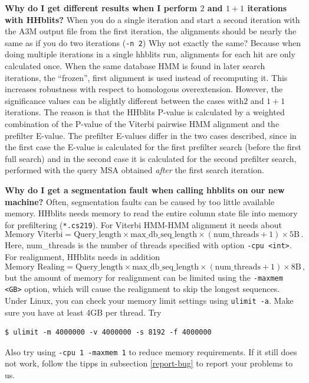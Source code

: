 \documentclass[11pt,a4paper]{article}
\begin{document}
{\label{2_vs_1+1} \bf Why do I get different results when I perform $2$ and $1+1$ iterations with HHblits?} When you do a single iteration and start a second iteration with the A3M output file from the first iteration, the alignments should be nearly the same as if you do two iterations (\verb`-n 2`) Why not exactly the same? Because when doing multiple iterations in a single hhblits run, alignments for each hit are only calculated once. When the same database HMM is found in later search iterations, the ``frozen'', first alignment is used instead of recomputing it. This increases robustness with respect to homologous overextension. However, the significance values can be slightly different between the cases with$2$ and $1+1$ iterations. The reason is that the HHblits P-value is calculated by a weighted combination of the P-value of the Viterbi pairwise HMM alignment and the prefilter E-value. The prefilter E-values differ in the two cases described, since in the first case the E-value is calculated for the first prefilter search (before the first full search) and in the second case it is calculated for the second prefilter search, performed with the query MSA obtained \emph{after} the first search iteration. 

{\bf Why do I get a segmentation fault when calling hhblits on our new machine?}
Often, segmentation faults can be caused by too little available memory. HHblits needs memory to read the entire column state file into memory for prefiltering (\verb`*.cs219`). For Viterbi HMM-HMM alignment it needs about 
\begin{equation}
\textrm{Memory Viterbi} = \textrm{Query\_length} \times \textrm{max\_db\_seq\_length} \times (\textrm{num\_threads}+1) \times 5 \textrm{B} \,. 
\end{equation}
Here, num\_threads is the number of threads specified with option \verb`-cpu <int>`. For realignment, HHblits needs in addition 
\begin{equation}
\textrm{Memory Realing} = \textrm{Query\_length} \times \textrm{max\_db\_seq\_length} \times (\textrm{num\_threads}+1) \times 8 \textrm{B} \,, 
\end{equation}
but the amount of memory for realignment can be limited using the \verb`-maxmem <GB>` option, which will cause the realignment to skip the longest sequences. Under Linux, you can check your memory limit settings using \verb`ulimit -a`. Make sure you have at least 4GB per thread. Try 
\begin{verbatim}
$ ulimit -m 4000000 -v 4000000 -s 8192 -f 4000000
\end{verbatim}
Also try using \verb`-cpu 1 -maxmem 1` to reduce memory requirements. If it still does not work, follow the tipps in subsection \ref{report-bug} to report your problems to us.
\end{document}
